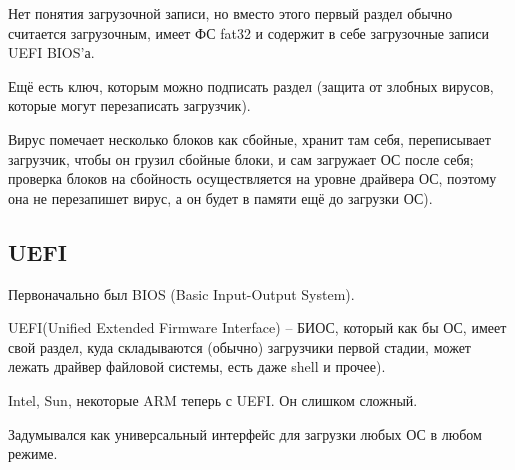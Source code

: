 \documentclass[a4paper,10pt]{article}
\begin{document}
Нет понятия загрузочной записи, но вместо этого первый раздел обычно считается загрузочным, имеет ФС fat32 и содержит в себе загрузочные записи UEFI BIOS'а.

Ещё есть ключ, которым можно подписать раздел (защита от злобных вирусов, которые могут перезаписать загрузчик).

Вирус помечает несколько блоков как сбойные, хранит там себя, переписывает загрузчик, чтобы он грузил сбойные блоки, и сам загружает ОС после себя; проверка блоков на сбойность осуществляется на уровне драйвера ОС, поэтому она не перезапишет вирус, а он будет в памяти ещё до загрузки ОС).

\subsection{UEFI}
Первоначально был BIOS (Basic Input-Output System).

UEFI(Unified Extended Firmware Interface) -- БИОС, который как бы ОС, имеет свой раздел, куда складываются (обычно) загрузчики первой стадии, может лежать драйвер файловой системы, есть даже shell и прочее).

Intel, Sun, некоторые ARM теперь с UEFI. Он слишком сложный.

Задумывался как универсальный интерфейс для загрузки любых ОС в любом режиме.
\end{document}
